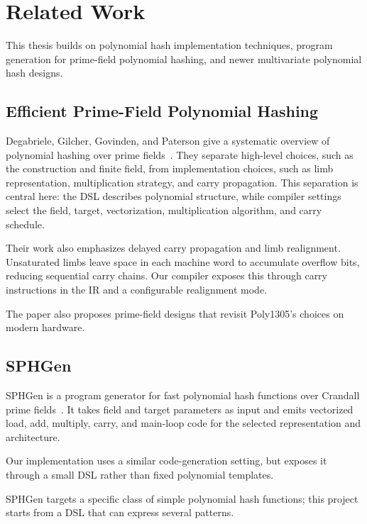 \chapter{Related Work}
\label{ch:related-work}

This thesis builds on polynomial hash implementation techniques, program generation for prime-field polynomial hashing, and newer multivariate polynomial hash designs.

\section{Efficient Prime-Field Polynomial Hashing}
\label{sec:sok}

Degabriele, Gilcher, Govinden, and Paterson give a systematic overview of polynomial hashing over prime fields~\cite{degabriele2024sok}. They separate high-level choices, such as the construction and finite field, from implementation choices, such as limb representation, multiplication strategy, and carry propagation. This separation is central here: the DSL describes polynomial structure, while compiler settings select the field, target, vectorization, multiplication algorithm, and carry schedule.

Their work also emphasizes delayed carry propagation and limb realignment. Unsaturated limbs leave space in each machine word to accumulate overflow bits, reducing sequential carry chains. Our compiler exposes this through carry instructions in the IR and a configurable realignment mode.

The paper also proposes prime-field designs that revisit Poly1305's choices on modern hardware.

\section{SPHGen}
\label{sec:sphgen}

SPHGen is a program generator for fast polynomial hash functions over Crandall prime fields~\cite{pegolotti2026sphgen}. It takes field and target parameters as input and emits vectorized load, add, multiply, carry, and main-loop code for the selected representation and architecture.

Our implementation uses a similar code-generation setting, but exposes it through a small DSL rather than fixed polynomial templates.

SPHGen targets a specific class of simple polynomial hash functions; this project starts from a DSL that can express several patterns.

